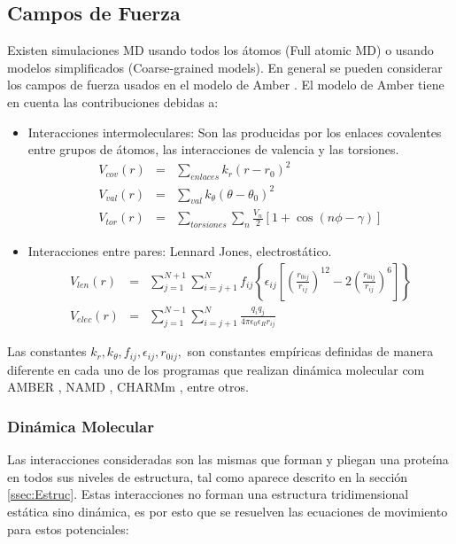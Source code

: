 \subsection{Campos de Fuerza}
Existen simulaciones MD usando todos los \'{a}tomos (Full atomic MD) o usando modelos simplificados (Coarse-grained models). En general se pueden considerar los campos de fuerza usados en el modelo de Amber \cite{Amber2016}. El modelo de Amber tiene en cuenta las contribuciones debidas a:
 \begin{itemize}
\item Interacciones intermoleculares: Son las producidas por los enlaces covalentes entre grupos de \'{a}tomos, las interacciones de valencia y las torsiones.
\begin{eqnarray}
V_{cov}(r)&=&\sum_{enlaces}k_r\left(r-r_0\right)^2\\
V_{val}(r)&=&\sum_{val}k_\theta\left(\theta-\theta_0\right)^2\\
V_{tor}(r)&=&\sum_{torsiones}\sum_{n}\frac{V_n}{2}\left[1+\cos(n\phi-\gamma)\right]
\end{eqnarray}
\item Interacciones entre pares: Lennard Jones, electrost\'{a}tico.
\begin{eqnarray}
V_{len}(r)&=&\sum_{j=1}^{N+1}\sum_{i=j+1}^N f_{ij}\left\{\epsilon_{ij}\left[\left(\frac{r_{0ij}}{r_{ij}}\right)^{12}-2\left(\frac{r_{0ij}}{r_{ij}}\right)^6\right]\right\}\\
V_{elec}(r)&=&\sum_{j=1}^{N-1}\sum_{i=j+1}^{N}\frac{q_iq_j}{4\pi\epsilon_0\epsilon_R r_{ij}}
\end{eqnarray}
\end{itemize}
Las constantes $k_r,k_\theta,f_{ij},\epsilon_{ij},r_{0ij},$ son constantes emp\'{i}ricas definidas de manera diferente en cada uno de los programas que realizan din\'{a}mica molecular com AMBER \cite{Amber2016}, NAMD \cite{Phillips2005ScalableNAMD}, CHARMm \cite{Brooks2009CHARMM:Program}, entre otros.\\
\subsubsection{Din\'{a}mica Molecular}
Las interacciones consideradas son las mismas que forman y pliegan una prote\'{i}na  en todos sus niveles de estructura, tal como aparece descrito en la secci\'{o}n \ref{ssec:Estruc}. Estas interacciones no forman una estructura tridimensional est\'{a}tica sino din\'{a}mica, es por esto que se resuelven las ecuaciones de movimiento para estos potenciales:

